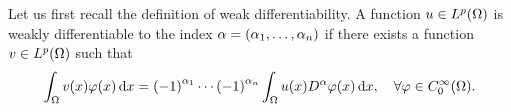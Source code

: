 \documentclass[english]{exercise}
\begin{document}
	\section{}

	Let us first recall the definition of weak differentiability.
	A function \(u \in L^p\parentheses*{\Omega}\) is weakly differentiable to the index \(\alpha = \parentheses*{\alpha_1, \ldots, \alpha_n}\) if there exists a function \(v \in L^p\parentheses*{\Omega}\) such that
	\begin{equation}\label{eq:2-1}
		\int_\Omega v\parentheses*{x}\varphi\parentheses*{x}\d x = \parentheses*{-1}^{\alpha_1} \cdots \parentheses*{-1}^{\alpha_n}\int_\Omega u\parentheses*{x}D^\alpha \varphi\parentheses*{x}\d x, \quad \forall\varphi \in C_0^\infty\parentheses*{\Omega}.
	\end{equation}
\end{document}
